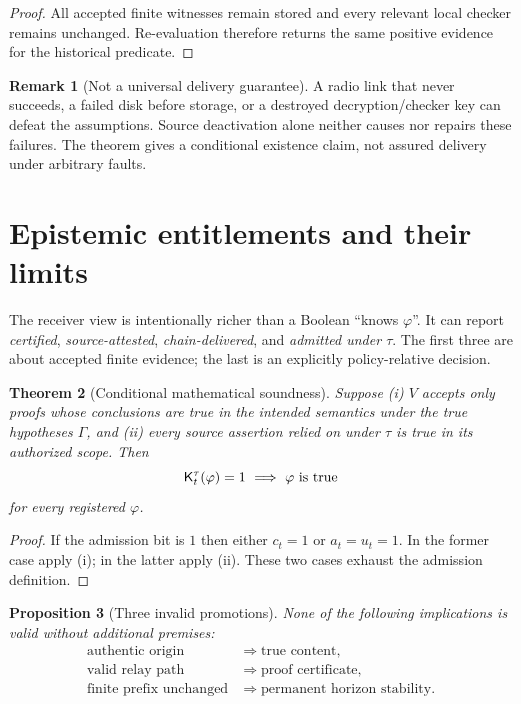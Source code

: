 \documentclass[11pt,letterpaper]{article}
\newtheorem{theorem}{Theorem}[section]\newtheorem{lemma}[theorem]{Lemma}\newtheorem{proposition}[theorem]{Proposition}\newtheorem{corollary}[theorem]{Corollary}\theoremstyle{definition}\newtheorem{definition}[theorem]{Definition}\newtheorem{example}[theorem]{Example}\newtheorem{remark}[theorem]{Remark}\newtheorem{conjecture}[theorem]{Conjecture}
\begin{document}
\begin{proof}
All accepted finite witnesses remain stored and every relevant local checker remains unchanged. Re-evaluation therefore returns the same positive evidence for the historical predicate.
\end{proof}
\begin{remark}[Not a universal delivery guarantee]
A radio link that never succeeds, a failed disk before storage, or a destroyed decryption/checker key can defeat the assumptions. Source deactivation alone neither causes nor repairs these failures. The theorem gives a conditional existence claim, not assured delivery under arbitrary faults.
\end{remark}

\section{Epistemic entitlements and their limits}
The receiver view is intentionally richer than a Boolean ``knows $\varphi$''. It can report \emph{certified}, \emph{source-attested}, \emph{chain-delivered}, and \emph{admitted under $\tau$}. The first three are about accepted finite evidence; the last is an explicitly policy-relative decision.
\begin{theorem}[Conditional mathematical soundness]
Suppose (i) $V$ accepts only proofs whose conclusions are true in the intended semantics under the true hypotheses $\Gamma$, and (ii) every source assertion relied on under $\tau$ is true in its authorized scope. Then
\[\K_t^\tau(\varphi)=1\ \Longrightarrow\ \varphi\text{ is true}\]
for every registered $\varphi$.
\end{theorem}
\begin{proof}
If the admission bit is $1$ then either $c_t=1$ or $a_t=u_t=1$. In the former case apply (i); in the latter apply (ii). These two cases exhaust the admission definition.
\end{proof}
\begin{proposition}[Three invalid promotions]
None of the following implications is valid without additional premises:
\begin{align*}
\text{authentic origin}&\Rightarrow\text{true content},\\
\text{valid relay path}&\Rightarrow\text{proof certificate},\\
\text{finite prefix unchanged}&\Rightarrow\text{permanent horizon stability}.
\end{align*}
\end{proposition}
\end{document}
